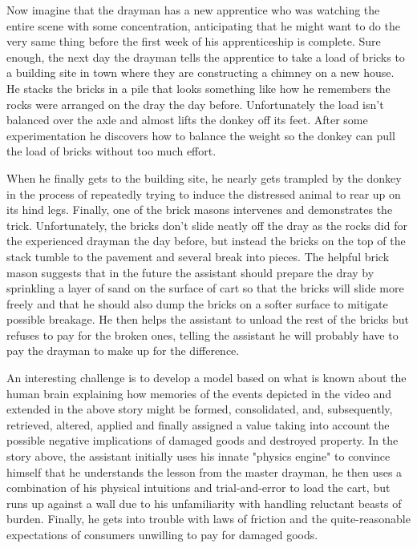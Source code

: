 Now imagine that the drayman has a new apprentice who was watching the entire scene with some concentration, anticipating that he might want to do the very same thing before the first week of his apprenticeship is complete. Sure enough, the next day the drayman tells the apprentice to take a load of bricks to a building site in town where they are constructing a chimney on a new house. He stacks the bricks in a pile that looks something like how he remembers the rocks were arranged on the dray the day before. Unfortunately the load isn't balanced over the axle and almost lifts the donkey off its feet. After some experimentation he discovers how to balance the weight so the donkey can pull the load of bricks without too much effort.

When he finally gets to the building site, he nearly gets trampled by the donkey in the process of repeatedly trying to induce the distressed animal to rear up on its hind legs. Finally, one of the brick masons intervenes and demonstrates the trick. Unfortunately, the bricks don't slide neatly off the dray as the rocks did for the experienced drayman the day before, but instead the bricks on the top of the stack tumble to the pavement and several break into pieces. The helpful brick mason suggests that in the future the assistant should prepare the dray by sprinkling a layer of sand on the surface of cart so that the bricks will slide more freely and that he should also dump the bricks on a softer surface to mitigate possible breakage. He then helps the assistant to unload the rest of the bricks but refuses to pay for the broken ones, telling the assistant he will probably have to pay the drayman to make up for the difference.

An interesting challenge is to develop a model based on what is known about the human brain explaining how memories of the events depicted in the video and extended in the above story might be formed, consolidated, and, subsequently, retrieved, altered, applied and finally assigned a value taking into account the possible negative implications of damaged goods and destroyed property. In the story above, the assistant initially uses his innate "physics engine" to convince himself that he understands the lesson from the master drayman, he then uses a combination of his physical intuitions and trial-and-error to load the cart, but runs up against a wall due to his unfamiliarity with handling reluctant beasts of burden. Finally, he gets into trouble with laws of friction and the quite-reasonable expectations of consumers unwilling to pay for damaged goods. 

